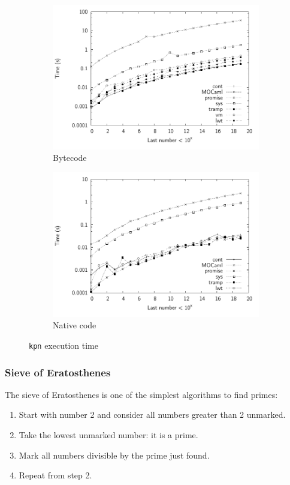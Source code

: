 \documentclass[12pt,twoside,notitlepage]{report}
\theoremstyle{plain}%
\theoremstyle{definition}
\theoremstyle{remark}
\begin{document}
\begin{figure}[H]
\centering
\begin{subfigure}[b]{0.9\linewidth}
\includegraphics[width=\linewidth]{./kpn_exec_times_bw}
\caption{Bytecode}
\label{fig:kpn_exec_times_bc}
\end{subfigure}
\begin{subfigure}[b]{0.9\linewidth}
\includegraphics[width=\linewidth]{./kpn_exec_times_opt_bw}
\caption{Native code}
\label{fig:kpn_exec_times_nat}
\end{subfigure}
\cprotect\caption{\verb|kpn| execution time}
\label{fig:kpn_exec_times}
\end{figure}



\subsubsection{Sieve of Eratosthenes}
The sieve of Eratosthenes is one of the simplest algorithms to find primes:
\begin{enumerate}
\item{Start with number 2 and consider all numbers greater than 2 unmarked.}
\item{Take the lowest unmarked number: it is a prime.}
\item{Mark all numbers divisible by the prime just found.}
\item{Repeat from step 2.}
\end{enumerate}
\end{document}
